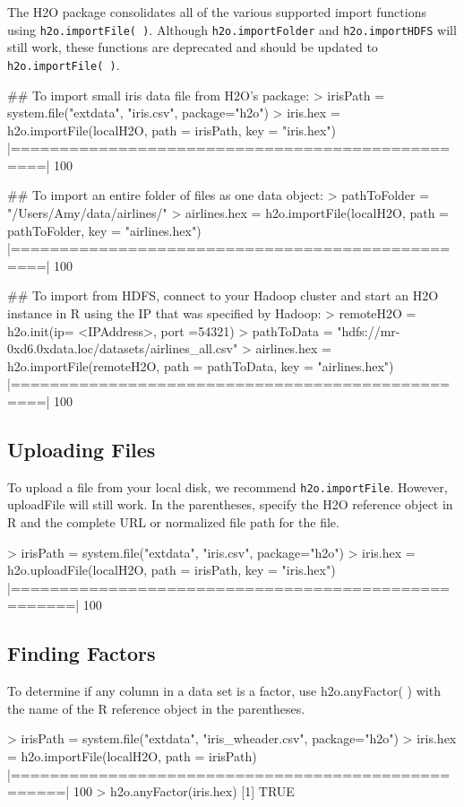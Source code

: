 \documentclass[11pt]{article}
\begin{document}
The H2O package consolidates all of the various supported import functions using {\texttt{h2o.importFile( )}}. Although {\texttt{h2o.importFolder}} and {\texttt{h2o.importHDFS}} will still work, these functions are deprecated and should be updated to {\texttt{h2o.importFile( )}}. 
\begin{spverbatim}

## To import small iris data file from H2O's package:
> irisPath = system.file("extdata", "iris.csv", package="h2o")
> iris.hex = h2o.importFile(localH2O, path = irisPath, key = "iris.hex")
      |=================================================| 100%

## To import an entire folder of files as one data object:
> pathToFolder = "/Users/Amy/data/airlines/"
> airlines.hex = h2o.importFile(localH2O, path = pathToFolder, key = "airlines.hex")
      |=================================================| 100%

## To import from HDFS, connect to your Hadoop cluster and start an H2O instance in R using the IP that was specified by Hadoop:
> remoteH2O = h2o.init(ip= <IPAddress>, port =54321)
> pathToData = "hdfs://mr-0xd6.0xdata.loc/datasets/airlines_all.csv"
> airlines.hex = h2o.importFile(remoteH2O, path = pathToData, key = "airlines.hex")
      |=================================================| 100%
\end{spverbatim}


\subsection{Uploading Files}

To upload a file from your local disk, we recommend {\texttt{h2o.importFile}}. However, uploadFile will still work. In the parentheses, specify the H2O reference object in R and the complete URL or normalized file path for the file.
\begin{spverbatim}
> irisPath = system.file("extdata", "iris.csv", package="h2o")
> iris.hex = h2o.uploadFile(localH2O, path = irisPath, key = "iris.hex")
|====================================================| 100%
\end{spverbatim}


\subsection{Finding Factors}

To determine if any column in a data set is a factor, use h2o.anyFactor( ) with the name of the R reference object in the parentheses. 
\begin{spverbatim}
> irisPath = system.file("extdata", "iris_wheader.csv", package="h2o")
> iris.hex = h2o.importFile(localH2O, path = irisPath)
|===================================================| 100%
> h2o.anyFactor(iris.hex)
[1] TRUE
\end{spverbatim}
\end{document}
